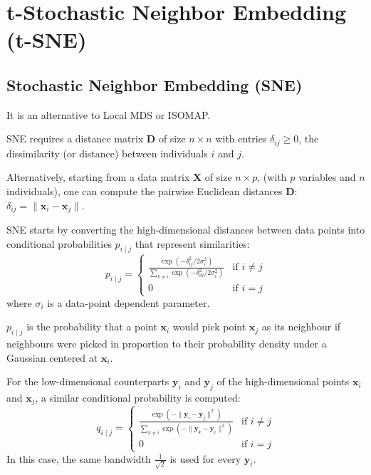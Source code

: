 \pagebreak
\section[t-Stochastic Neighbor Embedding]{t-Stochastic Neighbor Embedding (t-SNE)}

\subsection{Stochastic Neighbor Embedding (SNE)}
It is an alternative to Local MDS or ISOMAP.

SNE requires a distance matrix $\boldsymbol D$ of size $n \times n$ with
entries $\delta_{ij} \geq 0$, the dissimilarity (or distance) between
individuals $i$ and $j$.

Alternatively, starting from a data matrix $\boldsymbol X$ of size $n \times p$,
(with $p$ variables and $n$ individuals), one can compute the pairwise
Euclidean distances $\boldsymbol D$: $\delta_{ij} = \lVert \boldsymbol x_i - \boldsymbol x_j \rVert$.

SNE starts by converting the high-dimensional distances between data points
into conditional probabilities $p_{i \mid j}$ that represent similarities:
\begin{equation*}
	p_{i \mid j} =
	\begin{cases}
		\frac{\exp(-\delta_{ij}^2 / 2\sigma_i^2)}{\sum_{k \neq i} \exp(-\delta_{ik}^2 / 2\sigma_i^2)} & \text{if } i \neq j \\
		0                                                                                             & \text{if } i = j
	\end{cases}
\end{equation*}
where $\sigma_i$ is a data-point dependent  parameter.

\begin{note}
	$p_{i \mid j}$ is the probability that a point $\boldsymbol x_i$ would pick
	point $\boldsymbol x_j$ as its neighbour if neighbours were picked in proportion
	to their probability density under a Gaussian centered at $\boldsymbol x_i$.
\end{note}

For the low-dimensional counterparts $\boldsymbol y_i$ and $\boldsymbol y_j$ of
the high-dimensional points $\boldsymbol x_i$ and $\boldsymbol x_j$, a similar
conditional probability is computed:
\begin{equation*}
	q_{i \mid j} =
	\begin{cases}
		\frac{\exp(-\lVert \boldsymbol y_i - \boldsymbol y_j \rVert^2)}{\sum_{k \neq i} \exp(-\lVert \boldsymbol y_k - \boldsymbol y_i \rVert^2)} & \text{if } i \neq j \\
		0                                                                                                                                         & \text{if } i = j
	\end{cases}
\end{equation*}
In this case, the same bandwidth $\frac{1}{\sqrt{2}}$ is used for every $\boldsymbol y_i$.

